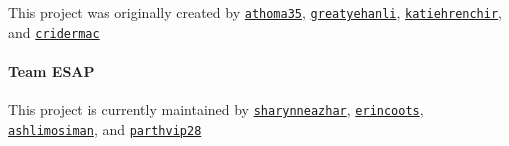 This project was originally created by \href{https://github.com/athoma35}{\tt athoma35}, \href{https://github.com/greatyehanli}{\tt greatyehanli}, \href{https://github.com/katiehrenchir}{\tt katiehrenchir}, and \href{https://github.com/cridermac}{\tt cridermac}

\paragraph*{Team E\+S\+AP}

This project is currently maintained by \href{https://github.com/sharynneazhar}{\tt sharynneazhar}, \href{https://github.com/erincoots}{\tt erincoots}, \href{https://github.com/ashlimosiman}{\tt ashlimosiman}, and \href{https://github.com/parthvip28}{\tt parthvip28} 